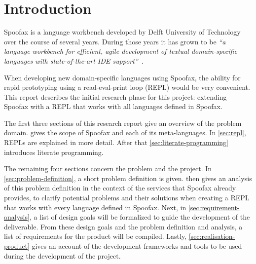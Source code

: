 \section*{Introduction}
\label{sec:introduction}

Spoofax is a language workbench developed by Delft University of
Technology over the course of several years. During those years it has
grown to be \textit{``a language workbench for efficient, agile
  development of textual domain-specific languages with
  state-of-the-art IDE support''}~\cite{Kats10a}.

When developing new domain-specific languages using Spoofax, the
ability for rapid prototyping using a read-eval-print loop (REPL)
would be very convenient. This report describes the initial research
phase for this project: extending Spoofax with a REPL that works with
all languages defined in Spoofax.

The first three sections of this research report give an overview of
the problem domain.  gives the scope of Spoofax and
each of its meta-languages. In \cref{sec:repl}, REPLs are explained in
more detail. After that \cref{sec:literate-programming} introduces
literate programming.

The remaining four sections concern the problem and the project. In
\cref{sec:problem-definition}, a short problem definition is given.
 then gives an analysis of this problem
definition in the context of the services that Spoofax already
provides, to clarify potential problems and their solutions when
creating a REPL that works with every language defined in Spoofax.
Next, in \cref{sec:requirement-analysis}, a list of design goals will
be formalized to guide the development of the deliverable. From these
design goals and the problem definition and analysis, a list of
requirements for the product will be compiled. Lastly,
\cref{sec:realisation-product} gives an account of the development
frameworks and tools to be used during the development of the
project.

